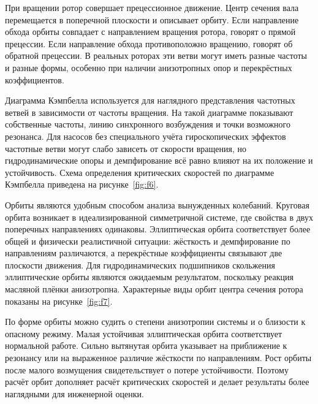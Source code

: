 При вращении ротор совершает прецессионное движение. Центр сечения вала перемещается в поперечной плоскости и описывает орбиту. Если направление обхода орбиты совпадает с направлением вращения ротора, говорят о прямой прецессии. Если направление обхода противоположно вращению, говорят об обратной прецессии. В реальных роторах эти ветви могут иметь разные частоты и разные формы, особенно при наличии анизотропных опор и перекрёстных коэффициентов.

Диаграмма Кэмпбелла используется для наглядного представления частотных ветвей в зависимости от частоты вращения. На такой диаграмме показывают собственные частоты, линию синхронного возбуждения и точки возможного резонанса. Для насосов без специального учёта гироскопических эффектов частотные ветви могут слабо зависеть от скорости вращения, но гидродинамические опоры и демпфирование всё равно влияют на их положение и устойчивость. Схема определения критических скоростей по диаграмме Кэмпбелла приведена на рисунке~\ref{fig:f6}.

Орбиты являются удобным способом анализа вынужденных колебаний. Круговая орбита возникает в идеализированной симметричной системе, где свойства в двух поперечных направлениях одинаковы. Эллиптическая орбита соответствует более общей и физически реалистичной ситуации: жёсткость и демпфирование по направлениям различаются, а перекрёстные коэффициенты связывают две плоскости движения. Для гидродинамических подшипников скольжения эллиптические орбиты являются ожидаемым результатом, поскольку реакция масляной плёнки анизотропна. Характерные виды орбит центра сечения ротора показаны на рисунке~\ref{fig:f7}.

По форме орбиты можно судить о степени анизотропии системы и о близости к опасному режиму. Малая устойчивая эллиптическая орбита соответствует нормальной работе. Сильно вытянутая орбита указывает на приближение к резонансу или на выраженное различие жёсткости по направлениям. Рост орбиты после малого возмущения свидетельствует о потере устойчивости. Поэтому расчёт орбит дополняет расчёт критических скоростей и делает результаты более наглядными для инженерной оценки.

